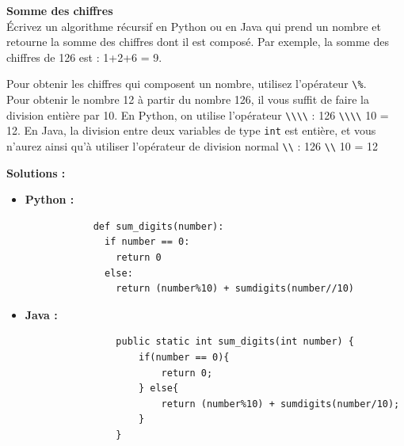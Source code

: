 \begin{Exercice} [5 minutes] \textbf{Somme des chiffres} \\

Écrivez un algorithme récursif en Python ou en Java qui prend un nombre et retourne la somme des chiffres dont il est composé. Par exemple, la somme des chiffres de 126 est : 1+2+6 = 9.

\begin{conseil}

Pour obtenir les chiffres qui composent un nombre, utilisez l'opérateur \lstinline{\%}. \\
Pour obtenir le nombre 12 à partir du nombre 126, il vous suffit de faire la division entière par 10. En Python, on utilise l'opérateur \lstinline{\\\\} : 126 \lstinline{\\\\} 10 = 12. En Java, la division entre deux variables de type \lstinline{int} est entière, et vous n'aurez ainsi qu'à utiliser l'opérateur de division normal \lstinline{\\} : 126 \lstinline{\\} 10 = 12

\end{conseil}

\textbf{Solutions :}

\begin{itemize}
    \item \textbf{Python :}
        \begin{verbatim}
            def sum_digits(number):
              if number == 0:
                return 0
              else:
                return (number%10) + sumdigits(number//10)
        \end{verbatim}
        
    \item \textbf{Java :}
        \begin{verbatim}
                public static int sum_digits(int number) {
                    if(number == 0){
                        return 0;
                    } else{
                        return (number%10) + sumdigits(number/10);
                    }
                }
                
        \end{verbatim}

\end{itemize}
\end{Exercice}

